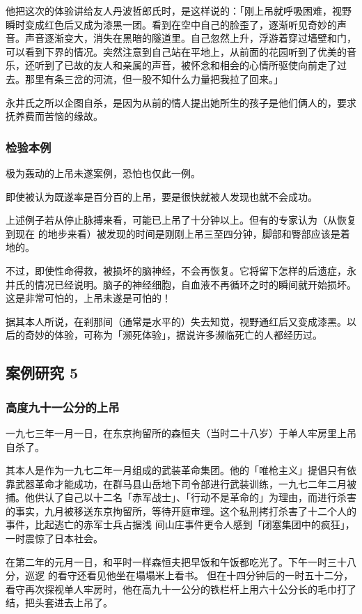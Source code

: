 \documentclass[UTF8]{ctexart}
\begin{document}
他把这次的体验讲给友人丹波哲郎氏时，是这样说的：「刚上吊就呼吸困难，视野瞬时变成红色后又成为漆黑一团。看到在空中自己的脸歪了，逐渐听见奇妙的声音。声音逐渐变大，消失在黑暗的隧道里。自己忽然上升，浮游着穿过墙壁和门，可以看到下界的情况。突然注意到自己站在平地上，从前面的花园听到了优美的音乐，还听到了已故的友人和亲属的声音，被怀念和相会的心情所驱使向前走了过去。那里有条三岔的河流，但一股不知什么力量把我拉了回来。」

永井氏之所以企图自杀，是因为从前的情人提出她所生的孩子是他们俩人的，要求抚养费而苦恼的缘故。

\subsubsection*{检验本例}

极为轰动的上吊未遂案例，恐怕也仅此一例。

即使被认为既遂率是百分百的上吊，要是很快就被人发现也就不会成功。

上述例子若从停止脉搏来看，可能已上吊了十分钟以上。但有的专家认为（从恢复到现在
的地步来看）被发现的时间是刚刚上吊三至四分钟，脚部和臀部应该是着地的。

不过，即使性命得救，被损坏的脑神经，不会再恢复。它将留下怎样的后遗症，永井氏的情况已经说明。脑子的神经细胞，自血液不再循环之时的瞬间就开始损坏。这是非常可怕的，上吊未遂是可怕的！

据其本人所说，在剎那间（通常是水平的）失去知觉，视野通红后又变成漆黑。以后的奇妙的体验，可称为「濒死体验」，据说许多濒临死亡的人都经历过。

\subsection{案例研究 5}
\subsubsection*{高度九十一公分的上吊}

一九七三年一月一日，在东京拘留所的森恒夫（当时二十八岁）于单人牢房里上吊自杀了。

其本人是作为一九七二年一月组成的武装革命集团。他的「唯枪主义」提倡只有依靠武器革命才能成功，在群马县山岳地下司令部进行武装训练，一九七二年二月被捕。他供认了自己以十二名「赤军战士」、「行动不是革命的」为理由，而进行杀害的事实，九月被移送东京拘留所，等待开庭审理。这个私刑拷打杀害了十二个人的事件，比起逃亡的赤军士兵占据浅 间山庄事件更令人感到「闭塞集团中的疯狂」，一时震惊了日本社会。

在第二年的元月一日，和平时一样森恒夫把早饭和午饭都吃光了。下午一时三十八分，巡逻 的看守还看见他坐在塌塌米上看书。
但在十四分钟后的一时五十二分，看守再次探视单人牢房时，他在高九十一公分的铁栏杆上用六十公分长的毛巾打了结，把头套进去上吊了。
\end{document}
